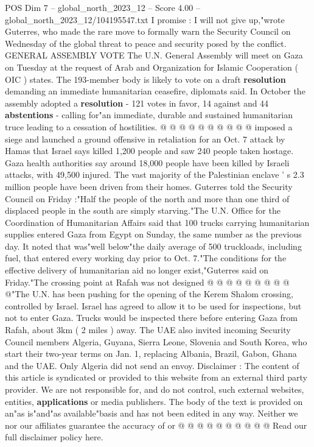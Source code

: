\begin{textsample}{POS Dim 7 – global\_north\_2023\_12 – Score 4.00 – global\_north\_2023\_12/104195547.txt}
I promise : I will not give up,"wrote Guterres, who made the rare move to formally warn the Security Council on Wednesday of the global threat to peace and security posed by the conflict.
GENERAL ASSEMBLY VOTE The U.N.
General Assembly will meet on Gaza on Tuesday at the request of Arab and Organization for Islamic Cooperation ( OIC ) states.
The 193-member body is likely to vote on a draft \textbf{resolution} demanding an immediate humanitarian ceasefire, diplomats said.
In October the assembly adopted a \textbf{resolution} - 121 votes in favor, 14 against and 44 \textbf{abstentions} - calling for"an immediate, durable and sustained humanitarian truce leading to a cessation of hostilities. @ @ @ @ @ @ @ @ @ @ imposed a siege and launched a ground offensive in retaliation for an Oct. 7 attack by Hamas that Israel says killed 1,200 people and saw 240 people taken hostage.
Gaza health authorities say around 18,000 people have been killed by Israeli attacks, with 49,500 injured.
The vast majority of the Palestinian enclave ' s 2.3 million people have been driven from their homes.
Guterres told the Security Council on Friday :"Half the people of the north and more than one third of displaced people in the south are simply starving."The U.N.
Office for the Coordination of Humanitarian Affairs said that 100 trucks carrying humanitarian supplies entered Gaza from Egypt on Sunday, the same number as the previous day.
It noted that was"well below"the daily average of 500 truckloads, including fuel, that entered every working day prior to Oct. 7."The conditions for the effective delivery of humanitarian aid no longer exist,"Guterres said on Friday."The crossing point at Rafah was not designed @ @ @ @ @ @ @ @ @ @"The U.N. has been pushing for the opening of the Kerem Shalom crossing, controlled by Israel.
Israel has agreed to allow it to be used for inspections, but not to enter Gaza.
Trucks would be inspected there before entering Gaza from Rafah, about 3km ( 2 miles ) away.
The UAE also invited incoming Security Council members Algeria, Guyana, Sierra Leone, Slovenia and South Korea, who start their two-year terms on Jan. 1, replacing Albania, Brazil, Gabon, Ghana and the UAE.
Only Algeria did not send an envoy.
Disclaimer : The content of this article is syndicated or provided to this website from an external third party provider.
We are not responsible for, and do not control, such external websites, entities, \textbf{applications} or media publishers.
The body of the text is provided on an"as is"and"as available"basis and has not been edited in any way.
Neither we nor our affiliates guarantee the accuracy of or @ @ @ @ @ @ @ @ @ @ Read our full disclaimer policy here.

\end{textsample}
